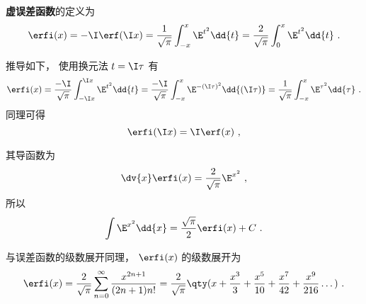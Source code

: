 

\textbf{虚误差函数}的定义为
\begin{equation}
\erfi(x) = -\I \erf(\I x) = \frac{1}{\sqrt{\pi}} \int_{-x}^x \E^{t^2} \dd{t}
= \frac{2}{\sqrt{\pi}} \int_0^x \E^{t^2} \dd{t}~.
\end{equation}

推导如下， 使用换元法 $t = \I \tau$ 有
\begin{equation}
\erfi(x) = \frac{-\I}{\sqrt{\pi}} \int_{-\I x}^{\I x} \E^{t^2} \dd{t}
= \frac{-\I}{\sqrt{\pi}} \int_{-x}^{x} \E^{-(\I \tau)^2} \dd{(\I \tau)}
= \frac{1}{\sqrt{\pi}} \int_{-x}^{x} \E^{\tau^2} \dd{\tau}~.
\end{equation}
同理可得
\begin{equation}
\erfi(\I x) = \I \erf(x)~,
\end{equation}

其导函数为
\begin{equation}
\dv{x} \erfi(x) = \frac{2}{\sqrt{\pi}} \E^{x^2}~,
\end{equation}
所以
\begin{equation}
\int \E^{x^2} \dd{x} = \frac{\sqrt{\pi}}{2} \erfi(x) + C~.
\end{equation}

与误差函数的级数展开同理， $\erfi(x)$ 的级数展开为
\begin{equation}
\erfi(x) = \frac{2}{\sqrt{\pi}} \sum_{n=0}^\infty \frac{x^{2n+1}}{(2n+1)n!}
= \frac{2}{\sqrt{\pi}}\qty(x + \frac{x^3}{3} + \frac{x^5}{10} + \frac{x^7}{42} + \frac{x^9}{216} \dots)~.
\end{equation}